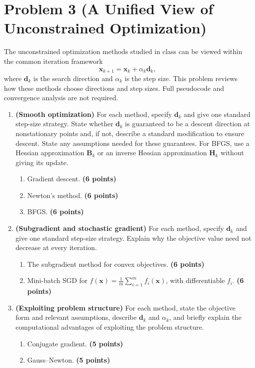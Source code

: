\documentclass[11pt,a4paper]{article}
\begin{document}
\section*{Problem 3 (A Unified View of Unconstrained Optimization)}

The unconstrained optimization methods studied in class
can be viewed within the common iteration framework
\[
    \mathbf{x}_{k+1}
    =\mathbf{x}_k+\alpha_k\mathbf{d}_k,
\]
where $\mathbf{d}_k$ is the search direction and $\alpha_k$
is the step size. This problem reviews how these methods
choose directions and step sizes.
Full pseudocode and convergence analysis are not required.

\begin{enumerate}
    \item \textbf{(Smooth optimization)}
    For each method, specify $\mathbf{d}_k$ and give one 
    standard step-size strategy. 
    State whether $\mathbf{d}_k$ is guaranteed to be a
    descent direction at nonstationary points and, if not, 
    describe a standard modification to ensure descent. 
    State any assumptions needed for these guarantees.
    For BFGS, use a Hessian approximation $\mathbf{B}_k$
    or an inverse Hessian approximation $\mathbf{H}_k$
    without giving its update.
    \begin{enumerate}
        \renewcommand{\labelenumii}{(\alph{enumii})}
        \item Gradient descent. \textbf{(6 points)}
        \item Newton's method. \textbf{(6 points)}
        \item BFGS. \textbf{(6 points)}
    \end{enumerate}

    \item \textbf{(Subgradient and stochastic gradient)}
    For each method, specify $\mathbf{d}_k$ and give one
    standard step-size strategy. Explain why the objective 
    value need not decrease at every iteration.
    \begin{enumerate}
        \renewcommand{\labelenumii}{(\alph{enumii})}
        \item The subgradient method for convex objectives.
        \textbf{(6 points)}

        \item Mini-batch SGD for
        $f(\mathbf{x})=\frac1m\sum_{i=1}^m f_i(\mathbf{x})$,
        with differentiable $f_i$.
        \textbf{(6 points)}
    \end{enumerate}

    \item \textbf{(Exploiting problem structure)}
    For each method, state the objective form and relevant
    assumptions, describe $\mathbf{d}_k$ and $\alpha_k$,
    and briefly explain the computational advantages
    of exploiting the problem structure.
    \begin{enumerate}
        \renewcommand{\labelenumii}{(\alph{enumii})}
        \item Conjugate gradient. \textbf{(5 points)}
        \item Gauss--Newton. \textbf{(5 points)}
    \end{enumerate}
\end{enumerate}
\end{document}
